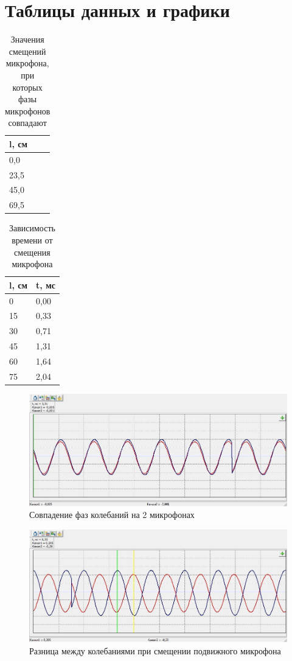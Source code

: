 \documentclass[12pt]{article}
\begin{document}
	\section{Таблицы данных и графики}
	\begin{table}[H]
		\begin{tabular}{|l|}
			\hline
			l, см \\ \hline
			0,0   \\ \hline
			23,5  \\ \hline
			45,0  \\ \hline
			69,5  \\ \hline
		\end{tabular}
		\caption{Значения смещений микрофона, при которых фазы микрофонов совпадают}
	\end{table}
	\begin{table}[H]
		\begin{tabular}{|l|l|}
			\hline
			l, см & t, мс \\ \hline
			0     & 0,00  \\ \hline
			15    & 0,33  \\ \hline
			30    & 0,71  \\ \hline
			45    & 1,31  \\ \hline
			60    & 1,64  \\ \hline
			75    & 2,04  \\ \hline
		\end{tabular}
		\caption{Зависимость времени от смещения микрофона}
	\end{table}
	\begin{figure}[H]
		\centering
		\includegraphics[scale=0.7]{graph1}
		\caption{Совпадение фаз колебаний на 2 микрофонах}
	\end{figure}
	\begin{figure}[H]
		\centering
		\includegraphics[scale=0.7]{graph2}
		\caption{Разница между колебаниями при смещении подвижного микрофона}
	\end{figure}
\end{document}
